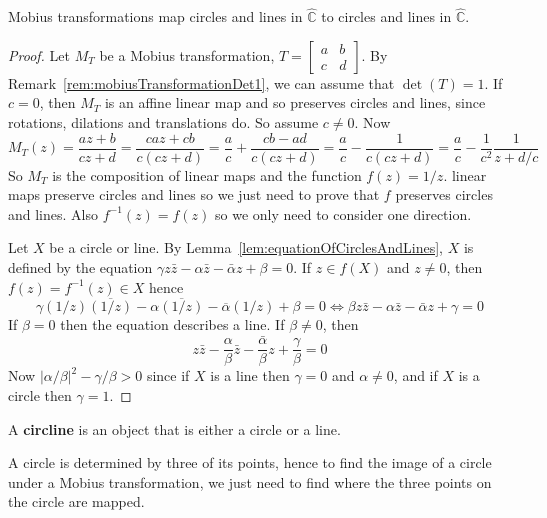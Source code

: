\begin{proposition}\label{prop:circlesAndLines}
	Mobius transformations map circles and lines in $\hat{\mathbb{C}}$ to circles and lines in $\hat{\mathbb{C}}$.
\end{proposition}

\begin{proof}
	Let $M_T$ be a Mobius transformation, $T = \begin{bmatrix} a & b \\ c & d \end{bmatrix}$. By Remark~\ref{rem:mobiusTransformationDet1}, we can assume that $\det(T) = 1$. If $c = 0$, then $M_T$ is an affine linear map and so preserves circles and lines, since rotations, dilations and translations do. So assume $c \ne 0$. Now
	\[
		M_T(z) = \frac{az + b}{cz + d} = \frac{caz + cb}{c(cz + d)} = \frac{a}{c} + \frac{cb - ad}{c(cz + d)} = \frac{a}{c} - \frac{1}{c(cz + d)} = \frac{a}{c} - \frac{1}{c^2} \frac{1}{z + d/c}
	\]
	So $M_T$ is the composition of linear maps and the function $f(z) = 1/z$. linear maps preserve circles and lines so we just need to prove that $f$ preserves circles and lines. Also $f^{-1}(z) = f(z)$ so we only need to consider one direction.

	Let $X$ be a circle or line. By Lemma~\ref{lem:equationOfCirclesAndLines}, $X$ is defined by the equation $\gamma z \bar{z} - \alpha \bar{z} - \bar{\alpha} z + \beta = 0$. If $z \in f(X)$ and $z \ne 0$, then $f(z) = f^{-1}(z) \in X$ hence
	\[
		\gamma(1 / z)\overline{(1 / z)} - \alpha \overline{(1 / z)} - \overline{\alpha}(1 / z) + \beta = 0 \Longleftrightarrow \beta z\bar{z} - \alpha \bar{z} - \bar{\alpha} z + \gamma = 0
	\]
	If $\beta = 0$ then the equation describes a line. If $\beta \ne 0$, then
	\[
		z \bar{z} - \frac{\alpha}{\beta} \bar{z} - \frac{\bar{\alpha}}{\beta} z + \frac{\gamma}{\beta} = 0
	\]
	Now $|\alpha / \beta|^2 - \gamma / \beta > 0$ since if $X$ is a line then $\gamma = 0$ and $\alpha \ne 0$, and if $X$ is a circle then $\gamma = 1$.
\end{proof}

\begin{definition}
	A \textbf{circline} is an object that is either a circle or a line.
\end{definition}

\begin{remark}
	A circle is determined by three of its points, hence to find the image of a circle under a Mobius transformation, we just need to find where the three points on the circle are mapped.
\end{remark}

